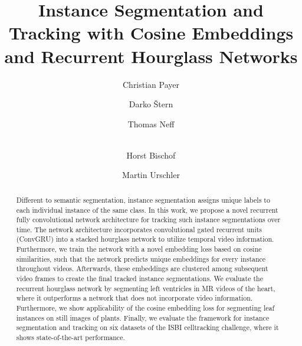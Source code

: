 \documentclass[runningheads,a4paper]{llncs}
\begin{document}
\mainmatter  %

\title{Instance Segmentation and Tracking with Cosine Embeddings and Recurrent Hourglass Networks}



\author{Christian Payer \and
Darko \v{S}tern \and
Thomas Neff \and\\
Horst Bischof \and
Martin Urschler}







\maketitle


\begin{abstract}
Different to semantic segmentation, instance segmentation assigns unique labels to each individual instance of the same class.
In this work, we propose a novel recurrent fully convolutional network architecture for tracking such instance segmentations over time. 
The network architecture incorporates convolutional gated recurrent units (\mbox{ConvGRU}) into a stacked hourglass network to utilize temporal video information.
Furthermore, we train the network with a novel embedding loss based on cosine similarities, such that the network predicts unique embeddings for every instance throughout videos.
Afterwards, these embeddings are clustered among subsequent video frames to create the final tracked instance segmentations.
We evaluate the recurrent hourglass network by segmenting left ventricles in MR videos of the heart, where it outperforms a network that does not incorporate video information.
Furthermore, we show applicability of the cosine embedding loss for segmenting leaf instances on still images of plants.
Finally, we evaluate the framework for instance segmentation and tracking on six datasets of the ISBI celltracking challenge, where it shows state-of-the-art performance.
\end{abstract}
\end{document}
